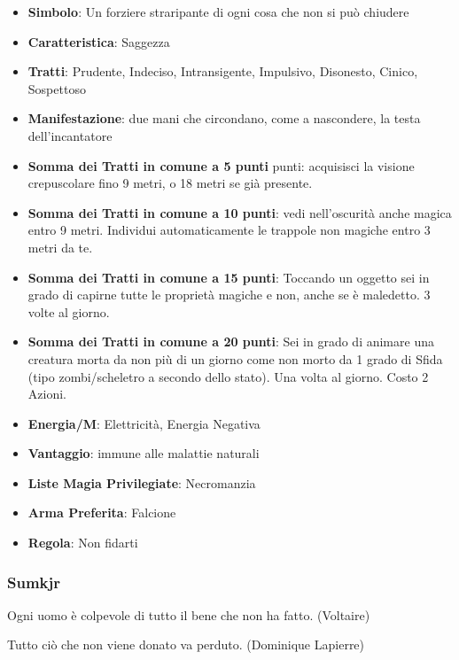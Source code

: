 \begin{multicols}{2}
\begin{itemize}[leftmargin=*] \setlength{\itemsep}{0pt}
\item \textbf{Simbolo}: Un forziere straripante di ogni cosa che non si può chiudere
\item \textbf{Caratteristica}: Saggezza
\item \textbf{Tratti}: Prudente, Indeciso, Intransigente, Impulsivo, Disonesto, Cinico, Sospettoso
\item \textbf{Manifestazione}: due mani che circondano, come a nascondere, la testa dell'incantatore
\item \textbf{Somma dei Tratti in comune a 5 punti} punti: acquisisci la visione crepuscolare fino 9 metri, o 18 metri se già presente.
\item \textbf{Somma dei Tratti in comune a 10 punti}: vedi nell'oscurità anche magica entro 9 metri. Individui automaticamente le trappole non magiche entro 3 metri da te.
\item \textbf{Somma dei Tratti in comune a 15 punti}: Toccando un oggetto sei in grado di capirne tutte le proprietà magiche e non, anche se è maledetto. 3 volte al giorno.
\item \textbf{Somma dei Tratti in comune a 20 punti}: Sei in grado di animare una creatura morta da non più di un giorno come non morto da 1 grado di Sfida (tipo zombi/scheletro a secondo dello stato). Una volta al giorno. Costo 2 Azioni.
\item \textbf{Energia/M}: Elettricità, Energia Negativa
\item \textbf{Vantaggio}: immune alle malattie naturali
\item \textbf{Liste Magia Privilegiate}: Necromanzia
\item \textbf{Arma Preferita}: Falcione
\item \textbf{Regola}: Non fidarti
\end{itemize}

\subsubsection{Sumkjr}\label{sumkjr}\hypertarget{sumkjr}{}

\begin{changemargin}{0.3cm}{0.3cm}\begin{enfasi}{
Ogni uomo è colpevole di tutto il bene che non ha fatto. (Voltaire)

\medskip

Tutto ciò che non viene donato va perduto. (Dominique Lapierre)

}\end{enfasi}\end{changemargin}\medskip


\end{multicols}
